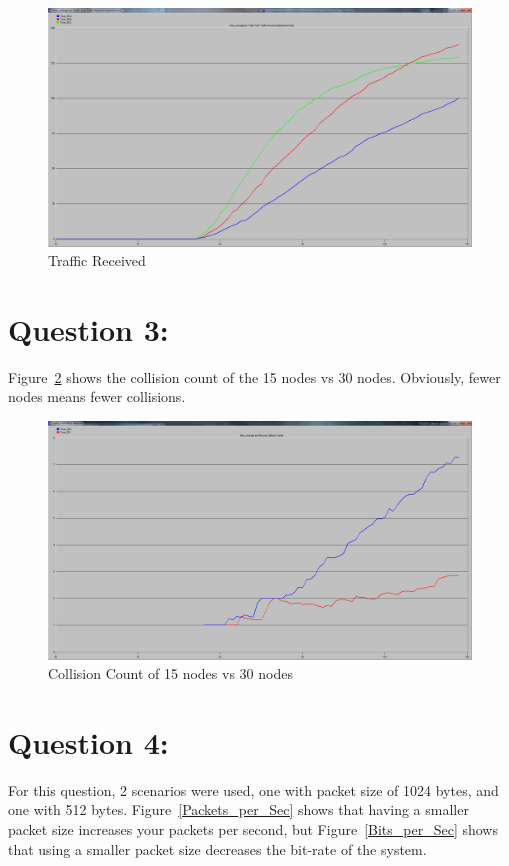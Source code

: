 \documentclass[letter,12pt]{article}
\begin{document}
	\begin{figure}[h!]
		\centering
			\includegraphics[width=.8\textwidth]{Q2_Traffic_Received.png}
		\caption{Traffic Received}
		\label{Q2_Traffic_Received}
	\end{figure}
		
\pagebreak

\section{Question 3:}
	Figure~\ref{Q3} shows the collision count of the 15 nodes vs 30 nodes.  Obviously, fewer nodes means fewer collisions.
	
	\begin{figure}[h!]
		\centering
			\includegraphics[width=.9\textwidth]{Q3.png}
		\caption{Collision Count of 15 nodes vs 30 nodes}
		\label{Q3}
	\end{figure}

\pagebreak

\section{Question 4:}
For this question, 2 scenarios were used, one with packet size of 1024 bytes, and one with 512 bytes.  Figure~\ref{Packets_per_Sec} shows that having a smaller packet size increases your packets per second, but Figure~\ref{Bits_per_Sec} shows that using a smaller packet size decreases the bit-rate of the system.
\end{document}
